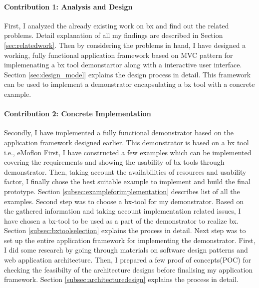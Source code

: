 \paragraph{Contribution 1: Analysis and Design}
First, I analyzed the already existing work on bx and find out the related problems. Detail explanation of all my findings are described in Section \ref{sec:relatedwork}. Then by considering the problems in hand, I have designed a working, fully functional application framework based on MVC pattern for implemenating a bx tool demonstartor along with a interactive user interface. Section \ref{sec:design_model} explains the design process in detail. This framework can be used to implement a demonstrator encapsulating a bx tool with a concrete example.

\paragraph{Contribution 2: Concrete Implementation}
Secondly, I have implemented a fully functional demonstrator based on the application framework designed earlier. This demonstrator is based on a bx tool i.e., eMoflon 
\newline\newline First, I have constructed a few examples which can be implemented covering the requirements and showing the usability of bx tools through demonstrator. Then, taking account the availabilities of resources and usability factor, I finally chose the best suitable example to implement and build the final prototype. Section \ref{subsec:exampleforimplementation} describes list of all the examples.
\newline\newline Second step was to choose a bx-tool for my demonstrator. Based on the gathered information and taking account implementation related issues, I have chosen a bx-tool to be used as a part of the demonstrator to realize bx. Section \ref{subsec:bxtoolselection} explains the process in detail.
\newline\newline Next step was to set up the entire application framework for implementing the demonstrator. First, I did some research by going through materials on software design patterns and web application architecture. Then, I prepared a few proof of concepts(POC) for checking the feasibilty of the architecture designs before finalising my application framework. Section \ref{subsec:architecturedesign} explains the process in detail.

